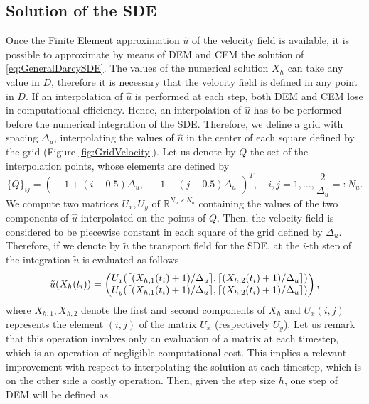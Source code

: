 \subsection{Solution of the SDE}

Once the Finite Element approximation $\hat{u}$ of the velocity field is available, it is possible to approximate by means of DEM and CEM the solution of \eqref{eq:GeneralDarcySDE}. The values of the numerical solution $X_h$ can take any value in $D$, therefore it is necessary that the velocity field is defined in any point in $D$. If an interpolation of $\hat{u}$ is performed at each step, both DEM and CEM lose in computational efficiency. Hence, an interpolation of $\hat{u}$ has to be performed before the numerical integration of the SDE. Therefore, we define a grid with spacing $\Delta_u$, interpolating the values of $\hat{u}$ in the center of each square defined by the grid (Figure \ref{fig:GridVelocity}). Let us denote by $Q$ the set of the interpolation points, whose elements are defined by
\begin{equation}\label{eq:InterpMatrix}
	\{Q\}_{ij} = \begin{pmatrix} -1 + (i-0.5)\Delta_u, & -1 + (j-0.5)\Delta_u \end{pmatrix}^T, \quad i,j = 1, \dots, \frac{2}{\Delta_u} =: N_u.
\end{equation}
We compute two matrices $U_x, U_y$ of $\mathbb{R}^{N_u \times N_u}$ containing the values of the two components of $\hat{u}$ interpolated on the points of $Q$. Then, the velocity field is considered to be piecewise constant in each square of the grid defined by $\Delta_u$. Therefore, if we denote by $\tilde{u}$ the transport field for the SDE, at the $i$-th step of the integration $\tilde{u}$ is evaluated as follows
\begin{equation}\label{eq:VelEval}
	\tilde{u}(X_h(t_i)) = \begin{pmatrix}	U_x(\lceil(X_{h,1}(t_i)+1)/\Delta_u\rceil,\lceil(X_{h,2}(t_i)+1)/\Delta_u\rceil) \\
					U_y(\lceil(X_{h,1}(t_i)+1)/\Delta_u\rceil,\lceil(X_{h,2}(t_i)+1)/\Delta_u\rceil) \end{pmatrix},
\end{equation}
where $X_{h,1}, X_{h,2}$ denote the first and second components of $X_h$ and $U_x(i,j)$ represents the element $(i,j)$ of the matrix $U_x$ (respectively $U_y$). Let us remark that this operation involves only an evaluation of a matrix at each timestep, which is an operation of negligible computational cost. This implies a relevant improvement with respect to interpolating the solution at each timestep, which is on the other side a costly operation. Then, given the step size $h$, one step of DEM will be defined as
